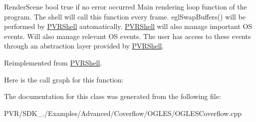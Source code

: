   Render\+Scene  bool true if no error occurred  Main rendering loop function of the program. The shell will call this function every frame. egl\+Swap\+Buffers() will be performed by \hyperlink{class_p_v_r_shell}{P\+V\+R\+Shell} automatically. \hyperlink{class_p_v_r_shell}{P\+V\+R\+Shell} will also manage important O\+S events. Will also manage relevant O\+S events. The user has access to these events through an abstraction layer provided by \hyperlink{class_p_v_r_shell}{P\+V\+R\+Shell}. 

Reimplemented from \hyperlink{class_p_v_r_shell_ae0eb5f797cbe993a22b8659f9c332578}{P\+V\+R\+Shell}.



Here is the call graph for this function\+:




The documentation for this class was generated from the following file\+:\begin{DoxyCompactItemize}
\item 
P\+V\+R/\+S\+D\+K\+\_./\+Examples/\+Advanced/\+Coverflow/\+O\+G\+L\+E\+S/O\+G\+L\+E\+S\+Coverflow.\+cpp\end{DoxyCompactItemize}

